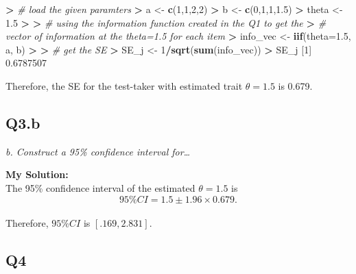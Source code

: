 \documentclass[
]{article}
\newenvironment{Shaded}{\begin{snugshade}}{\end{snugshade}}
\newcommand{\AttributeTok}[1]{\textcolor[rgb]{0.13,0.29,0.53}{#1}}
\newcommand{\CommentTok}[1]{\textcolor[rgb]{0.56,0.35,0.01}{\textit{#1}}}
\newcommand{\DecValTok}[1]{\textcolor[rgb]{0.00,0.00,0.81}{#1}}
\newcommand{\ErrorTok}[1]{\textcolor[rgb]{0.64,0.00,0.00}{\textbf{#1}}}
\newcommand{\FloatTok}[1]{\textcolor[rgb]{0.00,0.00,0.81}{#1}}
\newcommand{\FunctionTok}[1]{\textcolor[rgb]{0.13,0.29,0.53}{\textbf{#1}}}
\newcommand{\NormalTok}[1]{#1}
\newcommand{\OtherTok}[1]{\textcolor[rgb]{0.56,0.35,0.01}{#1}}
\newcommand{\SpecialCharTok}[1]{\textcolor[rgb]{0.81,0.36,0.00}{\textbf{#1}}}
\begin{document}
\begin{Shaded}
\begin{Highlighting}[]
\SpecialCharTok{\textgreater{}} \CommentTok{\# load the given paramters}
\ErrorTok{\textgreater{}}\NormalTok{ a }\OtherTok{\textless{}{-}} \FunctionTok{c}\NormalTok{(}\DecValTok{1}\NormalTok{,}\DecValTok{1}\NormalTok{,}\DecValTok{2}\NormalTok{,}\DecValTok{2}\NormalTok{)}
\SpecialCharTok{\textgreater{}}\NormalTok{ b }\OtherTok{\textless{}{-}} \FunctionTok{c}\NormalTok{(}\DecValTok{0}\NormalTok{,}\DecValTok{1}\NormalTok{,}\DecValTok{1}\NormalTok{,}\FloatTok{1.5}\NormalTok{)}
\SpecialCharTok{\textgreater{}}\NormalTok{ theta }\OtherTok{\textless{}{-}} \FloatTok{1.5}
\SpecialCharTok{\textgreater{}} 
\ErrorTok{\textgreater{}} \CommentTok{\# using the information function created in the Q1 to get the }
\ErrorTok{\textgreater{}} \CommentTok{\# vector of information at the theta=1.5 for each item}
\ErrorTok{\textgreater{}}\NormalTok{ info\_vec }\OtherTok{\textless{}{-}} \FunctionTok{iif}\NormalTok{(}\AttributeTok{theta=}\FloatTok{1.5}\NormalTok{, a, b)}
\SpecialCharTok{\textgreater{}} 
\ErrorTok{\textgreater{}} \CommentTok{\# get the SE}
\ErrorTok{\textgreater{}}\NormalTok{ SE\_j }\OtherTok{\textless{}{-}} \DecValTok{1}\SpecialCharTok{/}\FunctionTok{sqrt}\NormalTok{(}\FunctionTok{sum}\NormalTok{(info\_vec))}
\SpecialCharTok{\textgreater{}}\NormalTok{ SE\_j}
\NormalTok{[}\DecValTok{1}\NormalTok{] }\FloatTok{0.6787507}
\end{Highlighting}
\end{Shaded}

Therefore, the SE for the test-taker with estimated trait \(\theta=1.5\)
is 0.679.

\hypertarget{q3.b}{%
\subsection{Q3.b}\label{q3.b}}

\emph{b. Construct a 95\% confidence interval for\ldots{}}

\textbf{My Solution:}\\
The 95\% confidence interval of the estimated \(\theta=1.5\) is
\[95\%CI = 1.5\pm 1.96\times 0.679.\]\\
Therefore, \(95\%CI\) is \([.169, 2.831].\)

\hypertarget{q4}{%
\subsection{Q4}\label{q4}}
\end{document}
